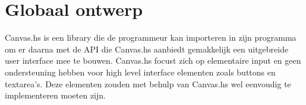 \section{Globaal ontwerp}  \label{sec:globaal}
Canvas.hs is een library die de programmeur kan importeren in zijn programma om er daarna met de API die Canvas.hs aanbiedt gemakkelijk een uitgebreide user interface mee te bouwen. Canvas.hs focust zich op elementaire input en geen ondersteuning hebben voor high level interface elementen zoals buttons en textarea's. Deze elementen zouden met behulp van Canvas.hs wel eenvoudig te implementeren moeten zijn.